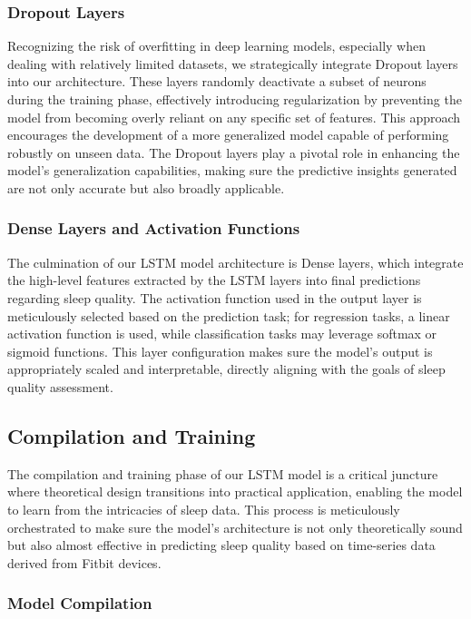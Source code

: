 \documentclass[10pt]{extarticle}
\begin{document}
\subsubsection{Dropout Layers}

Recognizing the risk of overfitting in deep learning models, especially when dealing with relatively limited datasets, we strategically integrate Dropout layers into our architecture. These layers randomly deactivate a subset of neurons during the training phase, effectively introducing regularization by preventing the model from becoming overly reliant on any specific set of features. This approach encourages the development of a more generalized model capable of performing robustly on unseen data. The Dropout layers play a pivotal role in enhancing the model's generalization capabilities, making sure the predictive insights generated are not only accurate but also broadly applicable.

\subsubsection{Dense Layers and Activation Functions}

The culmination of our LSTM model architecture is Dense layers, which  integrate the high-level features extracted by the LSTM layers into final predictions regarding sleep quality. The activation function used in the output layer is meticulously selected based on the prediction task; for regression tasks, a linear activation function is used, while classification tasks may leverage softmax or sigmoid functions. This layer configuration makes sure the model's output is appropriately scaled and interpretable, directly aligning with the goals of sleep quality assessment.

\subsection{Compilation and Training}

The compilation and training phase of our LSTM model is a critical juncture where theoretical design transitions into practical application, enabling the model to learn from the intricacies of sleep data. This process is meticulously orchestrated to make sure the model's architecture is not only theoretically sound but also almost effective in predicting sleep quality based on time-series data derived from Fitbit devices.

\subsubsection{Model Compilation}
\end{document}

